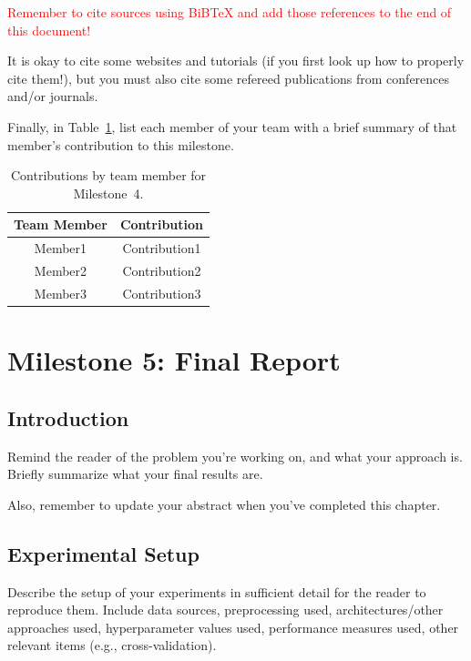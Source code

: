 \documentclass{report}
\begin{document}
\textcolor{red}{Remember to cite sources using BiBTeX and add those references to the end of this document!}

It is okay to cite some websites and tutorials (if you first look up how to properly cite them!), but you must also cite some refereed publications from conferences and/or journals.

Finally, in Table~\ref{tab:contribution4}, list each member of your team with a brief summary of that member's contribution to this milestone.

\begin{table}[]
    \caption{Contributions by team member for Milestone~4.}
    \centering
    \begin{tabular}{|c|c|} \hline
    {\bf Team Member}     &  {\bf Contribution}  \\ \hline
    Member1     &  Contribution1 \\
    Member2     &  Contribution2 \\
    Member3     &  Contribution3 \\ \hline
    \end{tabular}
    \label{tab:contribution4}
\end{table}

\chapter{Milestone 5: Final Report}


\section{Introduction}
\label{sec:M5-intro}

Remind the reader of the problem you're working on, and what your approach is.  Briefly summarize what your final results are.

Also, remember to update your abstract when you've completed this chapter.

\section{Experimental Setup}
\label{sec:M3-setup}

Describe the setup of your experiments  in sufficient detail for the reader to reproduce them.  Include data sources, preprocessing used, architectures/other approaches used, hyperparameter values used, performance measures used, other relevant items (e.g., cross-validation).
\end{document}
